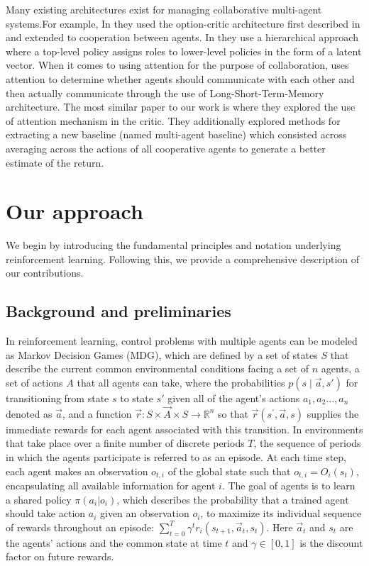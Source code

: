 \documentclass[conference]{IEEEtran}
\begin{document}
Many existing architectures exist for managing collaborative multi-agent systems.For example, In \cite{DOC} they used the option-critic architecture first described in \cite{optioncritic} and extended to cooperation between agents.
In \cite{CORD} they use a hierarchical approach where a top-level policy assigns roles to lower-level policies in the form of a latent vector. When it comes to using attention for the purpose of collaboration, \cite{jiang2018learningattentionalcommunicationmultiagent} uses attention to determine whether agents should communicate with each other and then actually communicate through the use of Long-Short-Term-Memory architecture.
The most similar paper to our work is \cite{MAAC} where they explored the use of attention mechanism in the critic. They additionally explored methods for extracting a new baseline (named multi-agent baseline) which consisted across averaging across the actions of all cooperative agents to generate a better estimate of the return.


\section{Our approach}
We begin by introducing the fundamental principles and notation underlying reinforcement learning. Following this, we provide a comprehensive description of our contributions.

\subsection{Background and preliminaries}
\noindent In reinforcement learning, control problems with multiple agents can be modeled as Markov Decision Games (MDG), which are defined by a set of states $S$ that describe the current common environmental conditions facing a set of $n$ agents, a set of actions $A$ that all agents can take, where the probabilities $p(s\mid \vec{a} ,s')$ for transitioning from state $s$ to state $s'$ given all of the agent's actions $a_1, a_2 ...,a_n$ denoted as $\vec{a}$, and a function $\vec{r}:S\times \vec{A}\times S \to \mathbb{R}^n$ so that $\vec{r}(s^{\prime},\vec{a},s)$ supplies the immediate rewards for each agent associated with this transition.
In environments that take place over a finite number of discrete periods $T$, the sequence of periods in which the agents participate is referred to as an episode.
At each time step, each agent makes an observation $o_{t, i}$ of the global state such that $o_{t,i} = O_i(s_t)$, encapsulating all available information for agent  $i$.
The goal of agents is to learn a shared policy $\pi(a_i|o_i)$, which describes the probability that a trained agent should take action $a_i$  given an observation $o_i$, to maximize its individual sequence of rewards throughout an episode: $\sum_{t = 0}^T\gamma^tr_i(s_{t+1},\vec{a}_t,s_t)$.  
Here $\vec{a}_t$ and $s_t$ are the agents' actions and the common state at time $t$ and $\gamma\in[0,1]$ is the discount factor on future rewards. 
\end{document}
